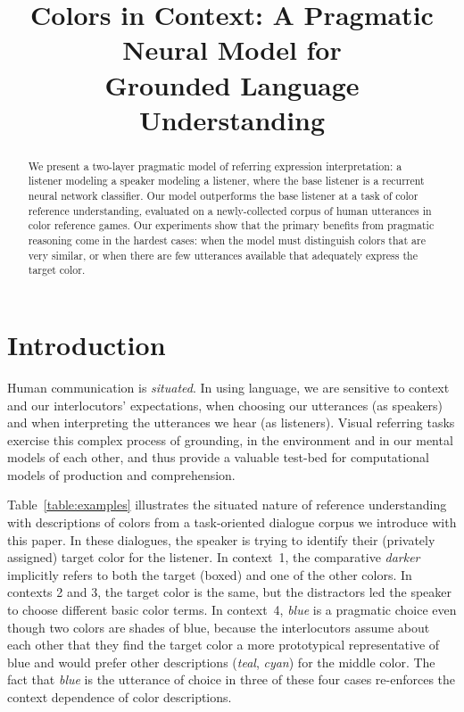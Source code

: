 \documentclass[11pt,letterpaper]{article}
\title{Colors in Context: A Pragmatic Neural Model for \\
Grounded Language Understanding}
\author{}
\date{}
\newcommand{\word}{\textit}
\renewcommand{\|}{\mid}
\newcommand{\Tabref}[1]{Table~\ref{#1}}
\begin{document}
\maketitle
\begin{abstract}


We present a two-layer pragmatic model of referring expression interpretation:
a listener modeling a speaker modeling a listener, where the base listener is a
recurrent neural network classifier. Our model outperforms the
base listener at a task of color reference understanding, evaluated on a
newly-collected corpus of human utterances in color reference games.
Our experiments show that the primary benefits from pragmatic reasoning come
in the hardest cases: when the model must distinguish colors that are very
similar, or when there are few utterances available that adequately express
the target color.

\end{abstract}

\section{Introduction} \label{sec:intro}


Human communication is \emph{situated}. In using language, we are sensitive
to context and our interlocutors' expectations, when choosing our
utterances (as speakers) and when interpreting the utterances we hear (as listeners).
Visual referring tasks exercise this complex process of grounding, 
in the environment and in
our mental models of each other, and thus provide a valuable test-bed for
computational models of production and comprehension.

\Tabref{table:examples} illustrates the situated nature of
reference understanding with descriptions of colors from a task-oriented
dialogue corpus we
introduce with this paper. In these dialogues, the speaker is trying
to identify their (privately assigned) target color for the
listener. In context~1, the comparative \word{darker} implicitly
refers to both the target (boxed) and one of the other colors. In
contexts 2 and 3, the target color is the same, but the distractors
led the speaker to choose different basic color terms. In
context~4, \word{blue} is a pragmatic choice even though two colors are
shades of blue, because the interlocutors assume about each other that
they find the target color a more prototypical representative of blue
and would prefer other descriptions (\word{teal}, \word{cyan}) for the middle color.
The fact that \word{blue} is the utterance of choice in three of these
four cases re-enforces the context dependence of color descriptions.
\end{document}

